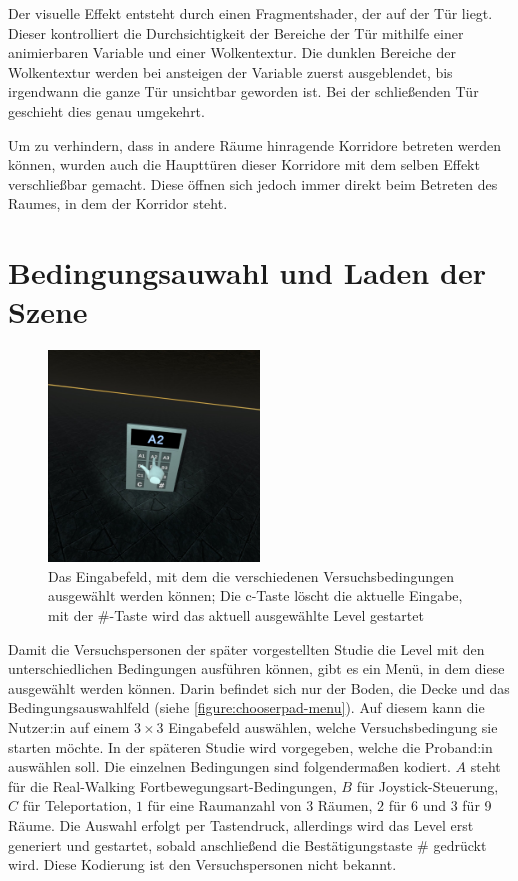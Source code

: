 Der visuelle Effekt entsteht durch einen Fragmentshader, der auf der Tür liegt. Dieser kontrolliert die Durchsichtigkeit der Bereiche der Tür mithilfe einer animierbaren Variable und einer Wolkentextur. Die dunklen Bereiche der Wolkentextur werden bei ansteigen der Variable zuerst ausgeblendet, bis irgendwann die ganze Tür unsichtbar geworden ist. Bei der schließenden Tür geschieht dies genau umgekehrt.

Um zu verhindern, dass in andere Räume hinragende Korridore betreten werden können, wurden auch die Haupttüren dieser Korridore mit dem selben Effekt verschließbar gemacht. Diese öffnen sich jedoch immer direkt beim Betreten des Raumes, in dem der Korridor steht.

\section{Bedingungsauwahl und Laden der Szene} \label{sec:chooserpad}
\begin{figure}[!h]
    \centering
    \includegraphics[width=0.5\textwidth]{vrscreenshots/better_chooserpad.jpg}
    \caption{Das Eingabefeld, mit dem die verschiedenen Versuchsbedingungen ausgewählt werden können; Die c-Taste löscht die aktuelle Eingabe, mit der \#-Taste wird das aktuell ausgewählte Level gestartet}\label{figure:chooserpad-menu}
\end{figure}
Damit die Versuchspersonen der später vorgestellten Studie die Level mit den unterschiedlichen Bedingungen ausführen können, gibt es ein Menü, in dem diese ausgewählt werden können. Darin befindet sich nur der Boden, die Decke und das Bedingungsauswahlfeld (siehe \autoref{figure:chooserpad-menu}). Auf diesem kann die Nutzer:in auf einem $3 \times 3$ Eingabefeld auswählen, welche Versuchsbedingung sie starten möchte. In der späteren Studie wird vorgegeben, welche die Proband:in auswählen soll. Die einzelnen Bedingungen sind folgendermaßen kodiert. $A$ steht für die Real-Walking Fortbewegungsart-Bedingungen, $B$ für Joystick-Steuerung, $C$ für Teleportation, $1$ für eine Raumanzahl von 3 Räumen, $2$ für 6 und $3$ für 9 Räume. Die Auswahl erfolgt per Tastendruck, allerdings wird das Level erst generiert und gestartet, sobald anschließend die Bestätigungstaste \# gedrückt wird. Diese Kodierung ist den Versuchspersonen nicht bekannt.


